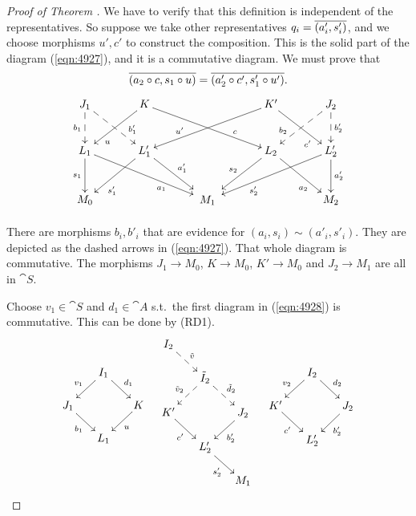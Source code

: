 \begin{proof}[Proof of Theorem \tup{\ref{thm:103}}]
We have to verify that this definition is independent of the representatives.
So suppose we take other representatives 
$q_i = \overline{ (a'_i, s'_i) }$, and we choose morphisms $u', c'$ to
construct the composition. This is the solid part of the diagram
(\ref{eqn:4927}), and it is a commutative diagram. We must prove that 
\[ \overline{ (a_2 \circ c, s_1 \circ u) }  = \overline{ (a'_2 \circ c', s'_1 \circ u') } . 
\]
\begin{equation} \label{eqn:4927}
\UseTips  \xymatrix @C=8ex @R=6ex  {
J_1
\ar@{-->}[d]_{b_1}
\ar@{-->}[dr]^(0.7){b'_1}
&
K
\ar[dl]^(0.7){u}
\ar[drr]^(0.7){c}
& & 
K'
\ar[dll]_(0.7){u'}
\ar[dr]_(0.7){c'}
& 
J_2
\ar@{-->}[dl]_(0.7){b_2}
\ar@{-->}[d]^{b'_2}
\\
L_1
\ar[d]_{s_1}
\ar[drr]_(0.65){a_1}
&
L'_1
\ar[dl]^(0.65){s'_1}
\ar[dr]^{a'_1}
& & 
L_2
\ar[dl]_{s_2}
\ar[dr]_(0.65){a_2}
& 
L'_2
\ar[dll]^(0.65){s'_2}
\ar[d]^{a'_2}
\\
M_0 
& &
*++{M_1}
& &
M_2
} 
\end{equation}

There are morphisms $b_i, b'_i$ that are evidence for 
$(a_i, s_i) \sim (a'_i, s'_i)$.
They are depicted as the dashed arrows in (\ref{eqn:4927}). 
That whole diagram is commutative. 
The morphisms $J_1 \to M_0$, $K \to M_0$, $K' \to M_0$ and 
$J_2 \to M_1$ are all in $\cat{S}$.

Choose $v_1 \in \cat{S}$ and $d_1 \in \cat{A}$ s.t.\ the first diagram in 
(\ref{eqn:4928}) is commutative. This can be done by (RD1). 
\begin{equation} \label{eqn:4928}
\UseTips \xymatrix @C=3.5ex @R=3.5ex {
\\
&
I_1
\ar[dl]_{v_1}
\ar[dr]^{d_1}
\\
J_1
\ar[dr]_{b_1}
& &
K
\ar[dl]^{u}
\\
&
L_1
} 
\quad  
\UseTips  \xymatrix @C=3.5ex @R=3.5ex {
I_2
\ar@{-->}[dr]^{\til{v}}
\\
& 
\til{I}_2
\ar@{-->}[dl]_{\til{v}_2}
\ar@{-->}[dr]^{\til{d}_2}
\\
K'
\ar[dr]_{c'}
& &
J_2
\ar[dl]^{b'_2}
\\
&
L'_2 
\ar[dr]_{s'_2}
\\
&
&
M_1
} 
\quad 
\xymatrix @C=3.5ex @R=3.5ex {
\\
&
I_2
\ar[dl]_{v_2}
\ar[dr]^{d_2}
\\
K'
\ar[dr]_{c'}
& &
J_2
\ar[dl]^{b'_2}
\\
&
L'_2
} 
\end{equation}


\end{proof}
